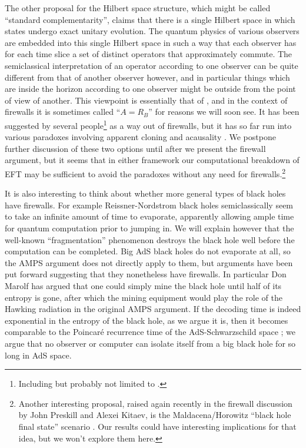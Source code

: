 \documentclass[12pt]{article}
\begin{document}
The other proposal for the Hilbert space structure, which might be called ``standard complementarity'', claims that there is a single Hilbert space in which states undergo exact unitary evolution.  The quantum physics of various observers are embedded into this single Hilbert space in such a way that each observer has for each time slice a set of distinct operators that approximately commute.  The semiclassical interpretation of an operator according to one observer can be quite different from that of another observer however, and in particular things which are inside the horizon according to one observer might be outside from the point of view of another.  This viewpoint is essentially that of \cite{sussthorug,sussthor,susspol}, and in the context of firewalls it is sometimes called ``$A=R_B$'' for reasons we will soon see.  It has been suggested by several people\footnote{Including but probably not limited to \cite{bousso, Papadodimas:2012aq, Jacobson:2012gh}.} as a way out of firewalls, but it has so far run into various paradoxes involving apparent cloning and acausality \cite{bousso,Susskind:2012uw}.  We postpone further discussion of these two options until after we present the firewall argument, but it seems that in either framework our computational breakdown of EFT may be sufficient to avoid the paradoxes without any need for firewalls.\footnote{Another interesting proposal, raised again recently in the firewall discussion by John Preskill and Alexei Kitaev, is the Maldacena/Horowitz ``black hole final state'' scenario \cite{Horowitz:2003he}.  Our results could have interesting implications for that idea, but we won't explore them here.}  

It is also interesting to think about whether more general types of black holes have firewalls.  For example Reissner-Nordstrom black holes semiclassically seem to take an infinite amount of time to evaporate, apparently allowing ample time for quantum computation prior to jumping in.  We will explain however that the well-known ``fragmentation'' phenomenon \cite{Preskill:1991tb,maldstrom} destroys the black hole well before the computation can be completed.  Big AdS black holes do not evaporate at all, so the AMPS argument does not directly apply to them, but arguments have been put forward suggesting that they nonetheless have firewalls.  In particular Don Marolf has argued that one could simply mine the black hole until half of its entropy is gone, after which the mining equipment would play the role of the Hawking radiation in the original AMPS argument.  If the decoding time is indeed exponential in the entropy of the black hole, as we argue it is, then it becomes comparable to the Poincar\'e recurrence time of the AdS-Schwarzschild space \cite{sussrec}; we argue that no observer or computer can isolate itself from a big black hole for so long in AdS space.  
\end{document}
